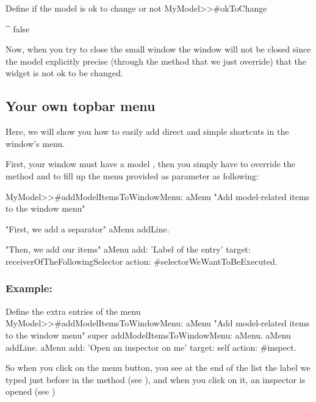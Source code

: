 \documentclass[a4paper,10pt,twoside]{book}
\begin{document}
\begin{method}{Define if the model is ok to change or not}
MyModel>>#okToChange

	^ false
\end{method}

Now, when you try to close the small window the window will not be closed since the model explicitly precise (through the method  that we just override) that the widget is not ok to be changed.

\subsection{Your own topbar menu}

Here, we will show you how to easily add direct and simple shortcuts in the window's menu.

First, your window must have a model , then you simply have to override the method  and to fill up the menu provided as parameter as following:

\begin{method}{}
MyModel>>#addModelItemsToWindowMenu: aMenu
	"Add model-related items to the window menu"
	
	"First, we add a separator"
	aMenu addLine.
	
	"Then, we add our items"
	aMenu
		add: 'Label of the entry'
		target: receiverOfTheFollowingSelector
		action: #selectorWeWantToBeExecuted.

\end{method} 

\subsubsection{Example:}

\begin{method}{Define the extra entries of the menu}
MyModel>>#addModelItemsToWindowMenu: aMenu
	"Add model-related items to the window menu"
	super addModelItemsToWindowMenu: aMenu.
	aMenu addLine.
	aMenu
		add: 'Open an inspector on me'
		target: self
		action: #inspect.
\end{method}

So when you click on the menu button, you see at the end of the list the label we typed just before in the method   (see ), and when you click on it, an inspector is opened (see )
\end{document}
